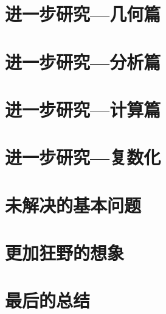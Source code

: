 \documentclass[a4paper,12pt]{book}
\numberwithin{problem}{section}
\numberwithin{definition}{section}
\numberwithin{lemma}{section}
\numberwithin{proposition}{section}
\numberwithin{theorem}{section}
\numberwithin{grammar}{section}
\numberwithin{program}{section}
\numberwithin{convention}{section}
\numberwithin{corollary}{section}
\begin{document}
\newpage

\chapter{进一步研究—几何篇}

\newpage

\chapter{进一步研究—分析篇}

\newpage

\chapter{进一步研究—计算篇}

\newpage

\chapter{进一步研究—复数化}

\newpage

\chapter{未解决的基本问题}

\newpage

\chapter{更加狂野的想象}

\newpage

\chapter{最后的总结}
\end{document}

